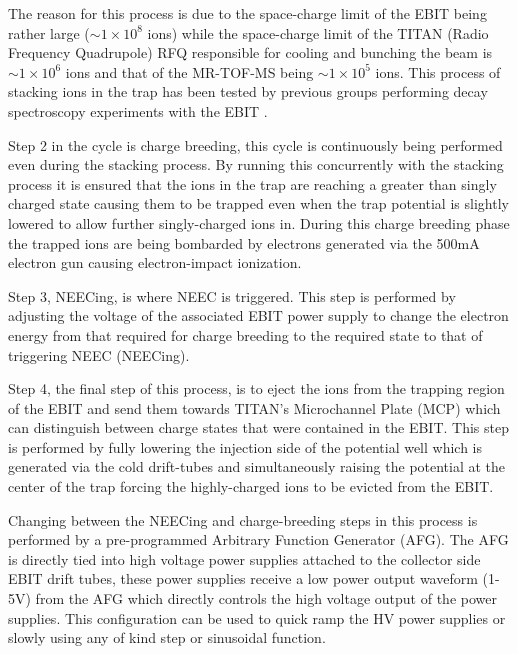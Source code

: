 \documentclass[jon_ringuette_thesis_proposal.tex]{subfiles}
\begin{document}
    The reason for this process is due to the space-charge limit of the EBIT being rather large ($\sim 1\times 10^8$ ions) while the space-charge limit of the TITAN (Radio Frequency Quadrupole) RFQ responsible for cooling and bunching the beam is $\sim 1\times 10^6$ ions and that of the MR-TOF-MS being $\sim 1\times 10^5$ ions.
    This process of stacking ions in the trap has been tested by previous groups performing decay spectroscopy experiments with the EBIT \cite{Lennarz2015}.

    Step 2 in the cycle is charge breeding, this cycle is continuously being performed even during the stacking process.
    By running this concurrently with the stacking process it is ensured that the ions in the trap are reaching a greater than singly charged state causing them to be trapped even when the trap potential is slightly lowered to allow further singly-charged ions in.
    During this charge breeding phase the trapped ions are being bombarded by electrons generated via the 500mA electron gun causing electron-impact ionization.

    Step 3, NEECing, is where NEEC is triggered.
    This step is performed by adjusting the voltage of the associated EBIT power supply to change the electron energy from that required for charge breeding to the required state to that of triggering NEEC (NEECing).

    Step 4, the final step of this process, is to eject the ions from the trapping region of the EBIT and send them towards TITAN's Microchannel Plate (MCP) which can distinguish between charge states that were contained in the EBIT.
    This step is performed by fully lowering the injection side of the potential well which is generated via the cold drift-tubes and simultaneously raising the potential at the center of the trap forcing the highly-charged ions to be evicted from the EBIT.

    Changing between the NEECing and charge-breeding steps in this process is performed by a pre-programmed Arbitrary Function Generator (AFG).
    The AFG is directly tied into high voltage power supplies attached to the collector side EBIT drift tubes, these power supplies receive a low power output waveform (1-5V)  from the AFG which directly controls the high voltage output of the power supplies.
    This configuration can be used to quick ramp the HV power supplies or slowly using any of kind step or sinusoidal function.
\end{document}
